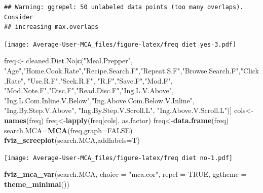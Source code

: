 \documentclass[
]{article}
\newenvironment{Shaded}{\begin{snugshade}}{\end{snugshade}}
\newcommand{\DataTypeTok}[1]{\textcolor[rgb]{0.13,0.29,0.53}{#1}}
\newcommand{\KeywordTok}[1]{\textcolor[rgb]{0.13,0.29,0.53}{\textbf{#1}}}
\newcommand{\NormalTok}[1]{#1}
\newcommand{\OtherTok}[1]{\textcolor[rgb]{0.56,0.35,0.01}{#1}}
\newcommand{\StringTok}[1]{\textcolor[rgb]{0.31,0.60,0.02}{#1}}
\begin{document}
\begin{verbatim}
## Warning: ggrepel: 50 unlabeled data points (too many overlaps). Consider
## increasing max.overlaps
\end{verbatim}

\texttt{[image: Average-User-MCA\_files/figure-latex/freq diet yes-3.pdf]}

\begin{Shaded}
\begin{Highlighting}[]
\NormalTok{freq<-}\StringTok{ }\NormalTok{cleaned.Diet.No[}\KeywordTok{c}\NormalTok{(}\StringTok{"Meal.Prepper"}\NormalTok{, }\StringTok{"Age"}\NormalTok{,}\StringTok{"Home.Cook.Rate"}\NormalTok{,}\StringTok{"Recipe.Search.F"}\NormalTok{,}\StringTok{"Repeat.S.F"}\NormalTok{,}\StringTok{"Browse.Search.F"}\NormalTok{,}\StringTok{"Click.Rate"}\NormalTok{,}
            \StringTok{"Use.R.F"}\NormalTok{,}\StringTok{"Seek.R.F"}\NormalTok{, }\StringTok{"R.F"}\NormalTok{,}\StringTok{"Save.F"}\NormalTok{,}\StringTok{"Mod.F"}\NormalTok{, }\StringTok{"Mod.Note.F"}\NormalTok{,}\StringTok{"Disc.F"}\NormalTok{,}\StringTok{"Read.Disc.F"}\NormalTok{,}\StringTok{"Ing.L.V.Above"}\NormalTok{,}
            \StringTok{"Ing.L.Com.Inline.V.Below"}\NormalTok{,}\StringTok{"Ing.Above.Com.Below.V.Inline"}\NormalTok{,  }\StringTok{"Ing.By.Step.V.Above"}\NormalTok{,  }\StringTok{"Ing.By.Step.V.Scroll.L"}\NormalTok{,}
            \StringTok{"Ing.Above.V.Scroll.L"}\NormalTok{)]}
\NormalTok{cols<-}\KeywordTok{names}\NormalTok{(freq)}
\NormalTok{freq<-}\KeywordTok{lapply}\NormalTok{(freq[cols], as.factor)}
\NormalTok{freq<-}\KeywordTok{data.frame}\NormalTok{(freq)}
\NormalTok{search.MCA=}\KeywordTok{MCA}\NormalTok{(freq,}\DataTypeTok{graph=}\OtherTok{FALSE}\NormalTok{)}
\KeywordTok{fviz_screeplot}\NormalTok{(search.MCA,}\DataTypeTok{addlabels=}\NormalTok{T)}
\end{Highlighting}
\end{Shaded}

\texttt{[image: Average-User-MCA\_files/figure-latex/freq diet no-1.pdf]}

\begin{Shaded}
\begin{Highlighting}[]
\KeywordTok{fviz_mca_var}\NormalTok{(search.MCA, }\DataTypeTok{choice =} \StringTok{"mca.cor"}\NormalTok{, }\DataTypeTok{repel =} \OtherTok{TRUE}\NormalTok{,}
             \DataTypeTok{ggtheme =} \KeywordTok{theme_minimal}\NormalTok{())}
\end{Highlighting}
\end{Shaded}
\end{document}
